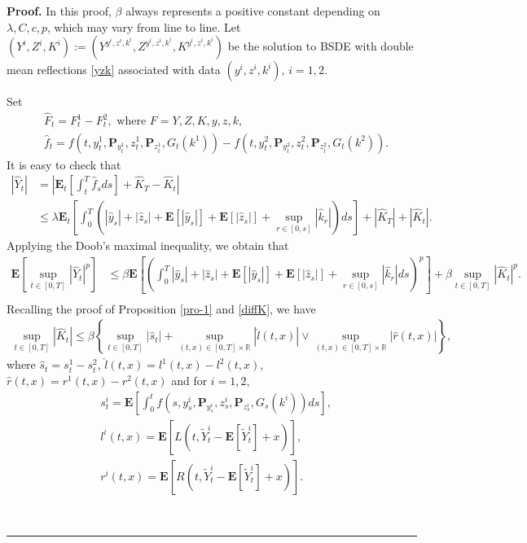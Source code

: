 \documentclass[10pt]{article}%
\numberwithin{equation}{section}
\newenvironment{proof}[1][Proof]{\noindent \textbf{#1.} }{\  \rule{0.5em}{0.5em}}
\def \E{\mathbf{E}}
\def \P{\mathbf{P}}
\begin{document}
\begin{proof}
In this proof,  $\beta$ always represents a positive constant depending on $\lambda,C,c,p$, which may vary from line to line. Let $(Y^i,Z^i,K^i):=(Y^{y^i,z^i,k^i},Z^{y^i,z^i,k^i},K^{y^i,z^i,k^i})$ be the solution to BSDE  with double mean reflections \eqref{yzk} associated with data $(y^i,z^i,k^i)$, $i=1,2$.

Set
\begin{align*}
&\hat{F}_t=F^1_t-F^2_t, \textrm{ where } F=Y,Z,K,y,z,k, \\ &\hat{f}_t=f(t,y^1_t,\P_{y^1_t},z^1_t,\P_{z^1_t},G_t(k^1))-f(t,y^2_t,\P_{y^2_t},z^2_t,\P_{z^2_t},G_t(k^2)).
\end{align*}
It is easy to check that 
\begin{align*}
|\hat{Y}_t|&=\left|\E_t\left[\int_t^T \hat{f}_sds\right]+\hat{K}_T-\hat{K}_t\right|\\
&\leq \lambda \E_t\left[\int_0^T \left(|\hat{y}_s|+|\hat{z}_s|+\E[|\hat{y}_s|]+\E[|\hat{z}_s|]+\sup_{r\in[0,s]}|\hat{k}_r|\right)ds \right]+|\hat{K}_T|+|\hat{K}_t|.
\end{align*}
Applying the Doob's maximal inequality, we obtain that  
\begin{equation}\begin{split}\label{differY}
 \E\left[\sup_{t\in[0,T]}|\hat{Y}_t|^p\right]
 &\leq \beta \E\left[\left(\int_{0}^{T}|\hat{y}_s|+|\hat{z}_s|+\E[|\hat{y}_s|]+\E[|\hat{z}_s|]+\sup_{r\in[0,s]}|\hat{k}_r|ds\right)^p\right]+\beta \sup_{t\in[0,T]}|\hat{K}_t|^p.\\   
\end{split}
\end{equation}
Recalling the proof of Proposition \ref{pro-1} and \eqref{diffK}, we have
\begin{align*}
\sup_{t\in[0,T]}|\hat{K}_t|\leq  \beta \left\{\sup_{t\in[0,T]}|\hat{s}_t|+\sup_{(t,x)\in[0,T]\times\mathbb{R}}|\hat{l}(t,x)|\vee \sup_{(t,x)\in[0,T]\times\mathbb{R}} |\hat{r}(t,x)|\right\},
\end{align*}
where $\hat{s}_t=s^1_t-s^2_t$, $\hat{l}(t,x)=l^1(t,x)-l^2(t,x)$, $\hat{r}(t,x)=r^1(t,x)-r^2(t,x)$ and for $i=1,2$, 
\begin{align*}
&s^i_t=\E\left[\int_0^t f\left(s,y^i_s,\P_{y^i_s},z^i_s,\P_{z^i_s},G_s(k^i)\right)ds\right], \\ 
&l^i(t,x)=\E\left[L\left(t,\widetilde{Y}^i_t-\E[\widetilde{Y}^i_t]+x\right)\right],\\  &r^i(t,x)=\E\left[R\left(t,\widetilde{Y}^i_t-\E[\widetilde{Y}^i_t]+x\right)\right].
\end{align*}

\end{proof}
\end{document}
